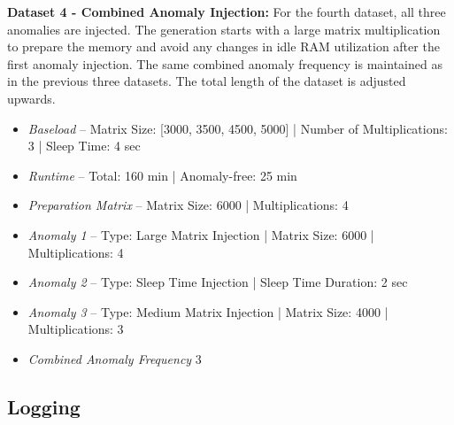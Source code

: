 \documentclass[12pt,oneside]{article}
\begin{document}
\textbf{Dataset 4 - Combined Anomaly Injection:} For the fourth dataset, all three anomalies are injected. The generation starts with a large matrix multiplication to prepare the memory and avoid any changes in idle RAM utilization after the first anomaly injection. The same combined anomaly frequency is maintained as in the previous three datasets. The total length of the dataset is adjusted upwards. 
\begin{itemize}
    \item \textit{Baseload} -- Matrix Size: [3000, 3500, 4500, 5000] | Number of Multiplications: 3 | Sleep Time: 4 sec
    \item \textit{Runtime} -- Total: 160 min | Anomaly-free: 25 min 
    \item \textit{Preparation Matrix} -- Matrix Size: 6000 | Multiplications: 4
    \item \textit{Anomaly 1} -- Type: Large Matrix Injection | Matrix Size: 6000 | Multiplications: 4
    \item \textit{Anomaly 2} -- Type: Sleep Time Injection | Sleep Time Duration: 2 sec
    \item \textit{Anomaly 3} -- Type: Medium Matrix Injection | Matrix Size: 4000 | Multiplications: 3 
    \item \textit{Combined Anomaly Frequency} 3
\end{itemize}

\subsection{Logging}
\end{document}

